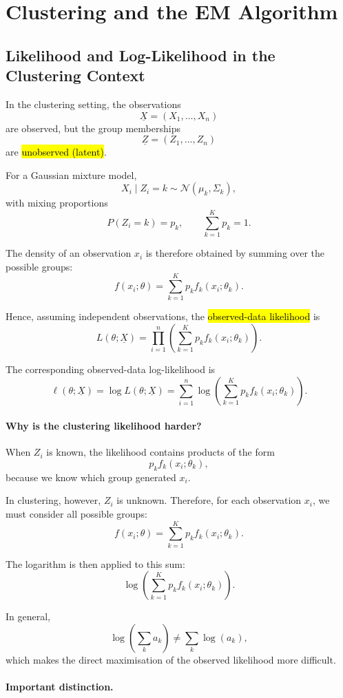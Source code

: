 \section{Clustering and the EM Algorithm}

\subsection{Likelihood and Log-Likelihood in the Clustering Context}

In the clustering setting, the observations
\[
\underline{X}=(X_1,\ldots,X_n)
\]
are observed, but the group memberships
\[
\underline{Z}=(Z_1,\ldots,Z_n)
\]
are \hl{unobserved (latent)}.

For a Gaussian mixture model,
\[
X_i\mid Z_i=k
\sim
\mathcal{N}(\mu_k,\Sigma_k),
\]
with mixing proportions
\[
P(Z_i=k)=p_k,
\qquad
\sum_{k=1}^Kp_k=1.
\]

The density of an observation $x_i$ is therefore obtained by
summing over the possible groups:
\[
f(x_i;\theta)
=
\sum_{k=1}^K
p_k f_k(x_i;\theta_k).
\]

Hence, assuming independent observations,
the \hl{observed-data likelihood} is
\[
L(\theta;\underline{X})
=
\prod_{i=1}^n
\left(
\sum_{k=1}^K
p_k f_k(x_i;\theta_k)
\right).
\]

The corresponding observed-data log-likelihood is
\[
\ell(\theta;\underline{X})
=
\log L(\theta;\underline{X})
=
\sum_{i=1}^n
\log
\left(
\sum_{k=1}^K
p_k f_k(x_i;\theta_k)
\right).
\]

\paragraph{Why is the clustering likelihood harder?}

When $Z_i$ is known, the likelihood contains products of the form
\[
p_kf_k(x_i;\theta_k),
\]
because we know which group generated $x_i$.

In clustering, however, $Z_i$ is unknown. Therefore, for each observation
$x_i$, we must consider all possible groups:
\[
f(x_i;\theta)
=
\sum_{k=1}^K
p_kf_k(x_i;\theta_k).
\]

The logarithm is then applied to this sum:
\[
\log
\left(
\sum_{k=1}^K
p_kf_k(x_i;\theta_k)
\right).
\]

In general,
\[
\log\left(\sum_k a_k\right)
\neq
\sum_k\log(a_k),
\]
which makes the direct maximisation of the observed likelihood
more difficult.

\paragraph{Important distinction.}

